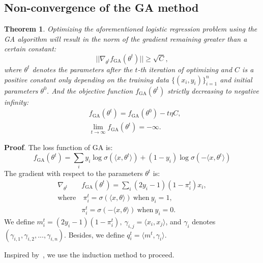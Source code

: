 \documentclass{article}
\theoremstyle{plain}
\newtheorem{theorem}{Theorem}[section]
\theoremstyle{definition}
\theoremstyle{remark}
\begin{document}
\subsection{Non-convergence of the GA method}
\label{sec:non_converge_GA}
\begin{theorem}
Optimizing the aforementioned logistic regression problem using the GA algorithm will result in the norm of the gradient remaining greater than a certain constant:
\begin{equation}
    ||\nabla_{\theta^t} f_{\text{GA}}(\theta^t)||\geq\sqrt{C},
\end{equation}
where $\theta^t$ denotes the parameters after the $t$-th iteration of optimizing and $C$ is a positive constant only depending on the training data $\{(x_i, y_i)\}_{i=1}^n$ and initial parameters $\theta^0$.
And the objective function $f_{\text{GA}}(\theta^t)$ strictly decreasing to negative infinity:
\begin{equation}
\begin{aligned}
&f_{\text{GA}}(\theta^{t})= f_{\text{GA}}(\theta^{0})-t\eta C,\\
&\lim_{t\rightarrow\infty}f_{\text{GA}}(\theta^{t})=-\infty.
\end{aligned}
\end{equation}
\end{theorem}
\textbf{Proof}.
The loss function of GA is:
\begin{equation}
    f_{\text{GA}}(\theta^t)=\sum_{i}y_i\log\sigma(\langle x,\theta^t\rangle)+(1-y_i)\log\sigma(-\langle x,\theta^t\rangle)
\end{equation}
The gradient with respect to the parameters $\theta^t$ is:
\begin{equation}
\begin{aligned}
    \nabla_{\theta^t}& f_{\text{GA}}(\theta^t)=\sum_i (2y_i-1)(1-\pi_i^t)x_i,\\
    \text{where}&~\pi_i^t=\sigma(\langle x,\theta\rangle)~\text{when}~y_i=1,\\
    &\pi_i^t=\sigma(-\langle x,\theta\rangle)~\text{when}~y_i=0.
\end{aligned}
\end{equation}
We define $m_i^t=(2y_i-1)(1-\pi_i^t),~\gamma_{i,j}=\langle x_i,x_j\rangle$, and $\gamma_i$ denotes $(\gamma_{i,1}, \gamma_{i,2},...,\gamma_{i,n})$. Besides, we define $q_i^t=\langle m^t, \gamma_i\rangle$.

Inspired by~\citet{DBLP:journals/corr/abs-2404-05868}, we use the induction method to proceed.
\end{document}
